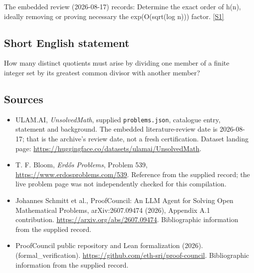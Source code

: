 \documentclass[11pt,a4paper]{article}
\newcommand{\sref}[2]{\hyperlink{source:#1:#2}{[S#2]}}
\begin{document}
The embedded review (2026-08-17) records: Determine the exact order of h(n), ideally removing or proving necessary the exp(O(sqrt(log n))) factor. \sref{statement}{1}

\subsection{Short English statement}

How many distinct quotients must arise by dividing one member of a finite integer set by its greatest common divisor with another member?

\subsection{Sources}

{\small

\begin{itemize}

\item[\hypertarget{source:statement:1}{S1}] ULAM.AI, \emph{UnsolvedMath}, supplied \texttt{problems.json}, catalogue entry, statement and background. The embedded literature-review date is 2026-08-17; that is the archive’s review date, not a fresh certification. Dataset landing page: \url{https://huggingface.co/datasets/ulamai/UnsolvedMath}.

\item[\hypertarget{source:statement:2}{S2}] T. F. Bloom, \emph{Erdős Problems}, Problem 539, \url{https://www.erdosproblems.com/539}. Reference from the supplied record; the live problem page was not independently checked for this compilation.

\item[\hypertarget{source:statement:3}{S3}] Johannes Schmitt et al., ProofCouncil: An LLM Agent for Solving Open Mathematical Problems, arXiv:2607.09474 (2026), Appendix A.1 contribution. \url{https://arxiv.org/abs/2607.09474}. Bibliographic information from the supplied record.

\item[\hypertarget{source:statement:4}{S4}] ProofCouncil public repository and Lean formalization (2026). (formal\_verification). \url{https://github.com/eth-sri/proof-council}. Bibliographic information from the supplied record.

\end{itemize}

}

\label{end:statement}
\end{document}
